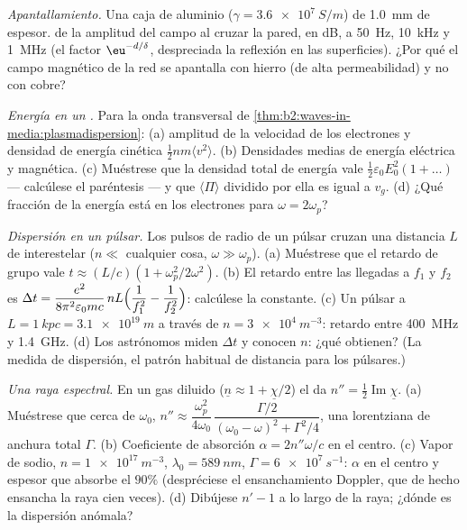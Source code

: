 \begin{exercise}[$\star\star$]\label{exo:b2:waves-in-media:6}
\emph{Apantallamiento.} Una caja de aluminio ($\gamma = \qty{3.6e7}{S/m}$) de \qty{1.0}{mm}
de espesor.  de la amplitud del campo al cruzar la pared, en dB, a
\qty{50}{Hz}, \qty{10}{kHz} y \qty{1}{MHz} (el factor $\eu^{-d/\delta}$, despreciada la reflexión en
las superficies). ¿Por qué el campo magnético de la red se apantalla
con hierro (de alta permeabilidad) y no con cobre?
\end{exercise}

\begin{exercise}[$\star\star$]\label{exo:b2:waves-in-media:7}
\emph{Energía en un .} Para la onda transversal de
\cref{thm:b2:waves-in-media:plasmadispersion}: (a) amplitud de la velocidad
de los electrones y densidad de energía cinética $\tfrac12nm\langle v^2\rangle$. (b)
Densidades medias de energía eléctrica y magnética. (c) Muéstrese que la
densidad total de energía vale $\tfrac12\varepsilon_0E_0^2(1 + \dots)$ --- calcúlese el paréntesis ---
y que $\langle\Pi\rangle$ dividido por ella es igual a $v_g$. (d) ¿Qué fracción de
la energía está en los electrones para $\omega = 2\omega_p$?
\end{exercise}

\begin{exercise}[$\star\star$]\label{exo:b2:waves-in-media:8}
\emph{Dispersión en un púlsar.} Los pulsos de radio de un púlsar cruzan una distancia
$L$ de  interestelar ($n \ll$ cualquier cosa, $\omega \gg \omega_p$). (a) Muéstrese
que el retardo de grupo vale $t \approx (L/c)(1 + \omega_p^2/2\omega^2)$. (b) El retardo
entre las llegadas a $f_1$ y $f_2$ es $\Delta t = \dfrac{e^2}{8\pi^2
\varepsilon_0mc}\,nL\Bigl(\dfrac1{f_1^2} - \dfrac1{f_2^2}\Bigr)$: calcúlese la constante.
(c) Un púlsar a $L = \qty{1}{kpc} = \qty{3.1e19}{m}$ a través de $n = \qty{3e4}{m^{-3}}$:
retardo entre \qty{400}{MHz} y \qty{1.4}{GHz}. (d) Los astrónomos miden
$\Delta t$ y conocen $n$: ¿qué obtienen? (La medida de dispersión, el
patrón habitual de distancia para los púlsares.)
\end{exercise}

\begin{exercise}[$\star\star$]\label{exo:b2:waves-in-media:9}
\emph{Una raya espectral.} En un gas diluido ($\underline n \approx 1 + \underline\chi/2$) el
 da $n'' = \tfrac12\operatorname{Im}\underline\chi$. (a) Muéstrese que cerca de
$\omega_0$, $n'' \approx \dfrac{\omega_p^2}{4\omega_0}\,\dfrac{\Gamma/2}{(\omega_0 - \omega)^2 + \Gamma^2/4}$, una
lorentziana de anchura total $\Gamma$. (b) Coeficiente de absorción $\alpha = 2n''\omega/c$
en el centro. (c) Vapor de sodio, $n = \qty{1e17}{m^{-3}}$, $\lambda_0 = \qty{589}{nm}$,
$\Gamma = \qty{6e7}{s^{-1}}$: $\alpha$ en el centro y espesor que absorbe el
$90\%$ (despréciese el ensanchamiento Doppler, que de hecho ensancha la raya
cien veces). (d) Dibújese $n' - 1$ a lo largo de la raya; ¿dónde es la
dispersión anómala?
\end{exercise}

